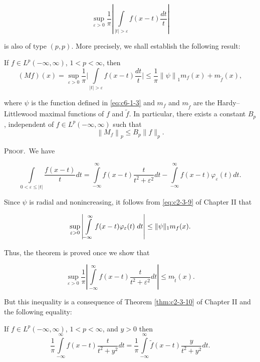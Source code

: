 \[
\sup_{\varepsilon>0}\frac{1}{\pi}\left|\int\limits_{|t|>\varepsilon}f(x-t)\frac{d t}{t}\right|
\]

is also of type $(p, p)$. More precisely, we shall establish the following result:

\begin{theorem}
\label{thm:c6-1-4}
If $f \in L^p(-\infty, \infty)$, $1 < p < \infty$, then
\[
(M f)(x)=\sup_{\varepsilon>0}\frac{1}{\pi}\Bigg|\int\limits_{|t|>\varepsilon}f(x-t)\frac{d t}{t}\Bigg|\leq\frac{1}{\pi}\left\|\psi\right\|_{1}m_{f}(x)+m_{\widetilde{f}}(x),
\]

where $\psi$ is the function defined in \eqref{eq:c6-1-3} and $m_f$ and $m_{\widetilde{f}}$ are the Hardy--Littlewood maximal functions of $f$ and $\widetilde{f}$. In particular, there exists a constant $B_p$, independent of $f \in L^p(-\infty, \infty)$ such that
\[
\left\|M_{f}\right\|_{p}\leq B_{p}\|f\|_{p}.
\]

\end{theorem}

\textsc{Proof.}\ We have

\[
\int\limits_{0<\varepsilon\leq|t|}\frac{f(x-t)}{t}dt=\int\limits_{-\infty}^{\infty}f(x-t)\frac{t}{t^{2}+\varepsilon^{2}}dt-\int\limits_{-\infty}^{\infty}f(x-t)\varphi_{\varepsilon}(t)dt.
\]

Since $\psi$ is radial and nonincreasing, it follows from \eqref{eq:c2-3-9} of Chapter II that

\[
\sup_{\varepsilon>0}\left|\intop_{-\infty}^{\infty}f(x-t)\varphi_{\varepsilon}(t)\;d t\right|\leq\|\psi\|_{1}m_{f}(x).
\]

Thus, the theorem is proved once we show that

\[
\sup_{\varepsilon>0}\frac{1}{\pi}\left|\int\limits_{-\infty}^{\infty}f(x-t)\frac{t}{t^{2}+\varepsilon^{2}}dt\right|\leq m_{\widetilde{t}}(x).
\]

But this inequality is a consequence of Theorem \ref{thm:c2-3-10} of Chapter II and the following equality:

\begin{lemma}
\label{lem:c6-1-5}
If $f \in L^p(-\infty, \infty)$, $1 < p < \infty$, and $y > 0$ then
\[
\frac{1}{\pi}\int\limits_{-\infty}^{\infty}f(x-t)\frac{t}{t^{2}+y^{2}}dt=\frac{1}{\pi}\int\limits_{-\infty}^{\infty}\tilde{f}(x-t)\frac{y}{t^{2}+y^{2}}dt.
\]

\end{lemma}

